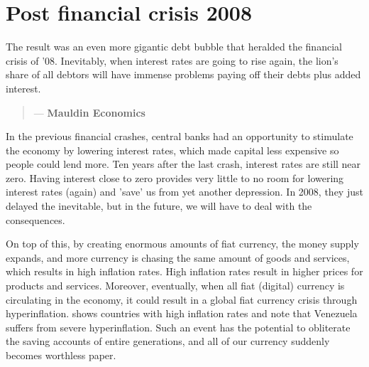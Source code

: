 \section{Post financial crisis 2008}
        
The result was an even more gigantic debt bubble that heralded the financial crisis of '08. Inevitably, when interest rates are going to rise again, the lion's share of all debtors will have immense problems paying off their debts plus added interest.\medskip 


\begin{quotation}

      \textit{}
      \begin{flushright}
        \small{--- \textbf{Mauldin Economics}}
      \end{flushright}
    
\end{quotation}

In the previous financial crashes, central banks had an opportunity to stimulate the economy by lowering interest rates, which made capital less expensive so people could lend more. Ten years after the last crash, interest rates are still near zero. Having interest close to zero provides very little to no room for lowering interest rates (again) and 'save' us from yet another depression. In 2008, they just delayed the inevitable, but in the future, we will have to deal with the consequences.\medskip

On top of this, by creating enormous amounts of fiat currency, the money supply expands, and more currency is chasing the same amount of goods and services, which results in high inflation rates. High inflation rates result in higher prices for products and services. Moreover, eventually, when all fiat (digital) currency is circulating in the economy, it could result in a global fiat currency crisis through hyperinflation.  shows countries with high inflation rates and note that Venezuela suffers from severe hyperinflation. Such an event has the potential to obliterate the saving accounts of entire generations, and all of our currency suddenly becomes worthless paper. 

